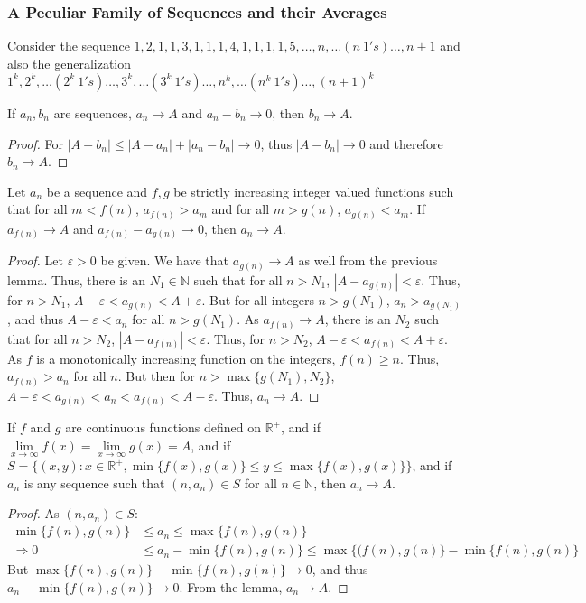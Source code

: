 \documentclass[crop=false,class=book]{standalone}
\begin{document}
\subsubsection{A Peculiar Family of Sequences and their Averages}
Consider the sequence $1,2,1,1,3,1,1,1,4,1,1,1,1,5,\hdots, n,\hdots (n\ 1's)\hdots, n+1$ and also the generalization $1^k, 2^k,\hdots (2^k\ 1's)\hdots, 3^k, \hdots (3^k\ 1's)\hdots, n^k, \hdots (n^k\ 1's)\hdots, (n+1)^k$
\begin{lemma}
If $a_n, b_n$ are sequences, $a_n\rightarrow A$ and $a_n-b_n\rightarrow 0$, then $b_n \rightarrow A$.
\end{lemma}
\begin{proof}
For $|A-b_n| \leq |A-a_n|+|a_n-b_n| \rightarrow 0$, thus $|A-b_n|\rightarrow 0$ and therefore $b_n \rightarrow A$.
\end{proof}
\begin{lemma}
Let $a_n$ be a sequence and $f,g$ be strictly increasing integer valued functions such that for all $m<f(n)$, $a_{f(n)}>a_m$ and for all $m>g(n)$, $a_{g(n)}<a_m$. If $a_{f(n)}\rightarrow A$ and $a_{f(n)}-a_{g(n)}\rightarrow 0$, then $a_n \rightarrow A$.
\end{lemma}
\begin{proof}
Let $\varepsilon>0$ be given. We have that $a_{g(n)}\rightarrow A$ as well from the previous lemma. Thus, there is an $N_1 \in \mathbb{N}$ such that for all $n>N_1$, $|A-a_{g(n)}|<\varepsilon$. Thus, for $n>N_1$, $A-\varepsilon < a_{g(n)}<A+\varepsilon$. But for all integers $n>g(N_1)$, $a_n >a_{g(N_1)}$, and thus $A-\varepsilon < a_n$ for all $n>g(N_1)$. As $a_{f(n)}\rightarrow A$, there is an $N_2$ such that for all $n>N_2$, $|A-a_{f(n)}|<\varepsilon$. Thus, for $n>N_2$, $A-\varepsilon < a_{f(n)}<A+\varepsilon$. As $f$ is a monotonically increasing function on the integers, $f(n)\geq n$. Thus, $a_{f(n)}>a_n$ for all $n$. But then for $n>\max\{g(N_1),N_2\}$, $A-\varepsilon < a_{g(n)} < a_n < a_{f(n)}<A-\varepsilon$. Thus, $a_n \rightarrow A$.
\end{proof}
\begin{lemma}
If $f$ and $g$ are continuous functions defined on $\mathbb{R}^+$, and if $\underset{x\rightarrow \infty}\lim f(x) = \underset{x\rightarrow \infty}\lim g(x)=A$, and if $S = \{(x,y):x\in \mathbb{R}^+,\min\{f(x),g(x)\}\leq y \leq \max\{f(x),g(x)\}\}$, and if $a_n$ is any sequence such that $(n,a_n)\in S$ for all $n\in \mathbb{N}$, then $a_n \rightarrow A$.
\end{lemma}
\begin{proof}
As $(n,a_n)\in S$:
\begin{align*}
    \min\{f(n),g(n)\} &\leq a_n \leq \max\{f(n),g(n)\}\\
    \Rightarrow 0 &\leq a_n - \min\{f(n),g(n)\} \leq \max\{(f(n),g(n)\}-\min\{f(n),g(n)\}    
\end{align*}
But $\max\{f(n),g(n)\}-\min\{f(n),g(n)\} \rightarrow 0$, and thus $a_n - \min\{f(n),g(n)\} \rightarrow 0$. From the lemma, $a_n \rightarrow A$.
\end{proof}
\end{document}
